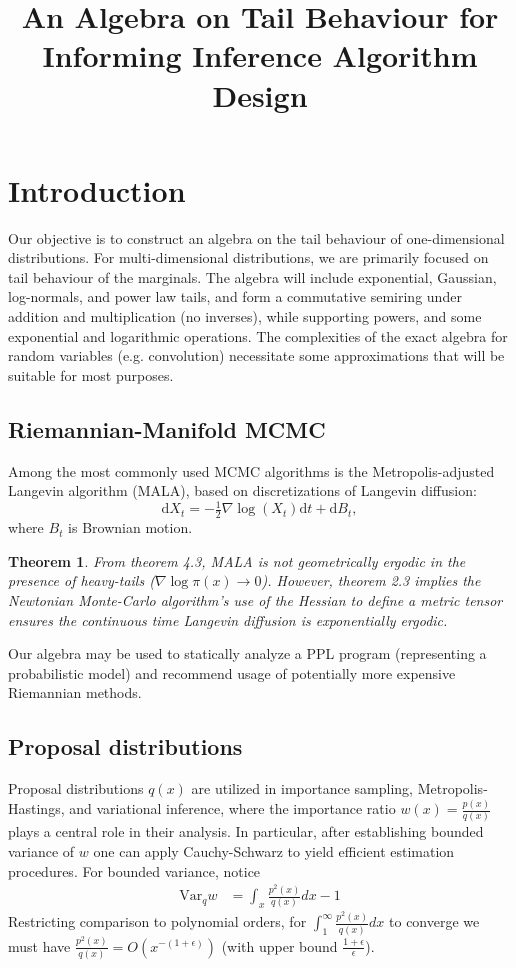 \documentclass{article}
\title{An Algebra on Tail Behaviour for Informing Inference Algorithm Design}
\newcommand{\dd}{\mathrm{d}}
\newtheorem{theorem}{Theorem}
\theoremstyle{definition}
\begin{document}
\maketitle

\section{Introduction}
Our objective is to construct an algebra on the tail behaviour of one-dimensional distributions. For multi-dimensional distributions, we are primarily focused on tail behaviour of the marginals. The algebra will include exponential, Gaussian, log-normals, and power law tails, and form a commutative semiring under addition and multiplication (no inverses), while supporting powers, and some exponential and logarithmic operations. The complexities of the exact algebra for random variables (e.g. convolution) necessitate some approximations that will be suitable for most purposes. 

\subsection{Riemannian-Manifold MCMC}
\label{ssec:mcmc}

Among the most commonly used MCMC algorithms is the Metropolis-adjusted Langevin algorithm (MALA), based on discretizations of Langevin diffusion:
\[
\dd X_t = -\tfrac12 \nabla \log(X_t) \dd t + \dd B_t,
\]
where $B_t$ is Brownian motion. 

\begin{theorem}\label{thm:nmc-ergodic}
    From \cite{roberts1996exponential} theorem 4.3, MALA is not geometrically ergodic
    in the presence of heavy-tails ($\nabla  \log \pi(x) \to 0$).
    However, theorem 2.3 implies the Newtonian Monte-Carlo algorithm's use of the Hessian to define a metric tensor ensures the continuous
    time Langevin diffusion is exponentially ergodic. 
\end{theorem}
Our algebra may be used
to statically analyze a PPL program (representing a probabilistic model) and
recommend usage of potentially more expensive Riemannian methods.

\subsection{Proposal distributions}

Proposal distributions $q(x)$ are utilized in importance sampling, Metropolis-Hastings,
and variational inference, where the importance ratio $w(x) = \frac{p(x)}{q(x)}$ plays a
central role in their analysis. In particular, after establishing bounded variance of $w$ one
can apply Cauchy-Schwarz to yield efficient estimation procedures. For bounded variance, notice
\begin{align*}
    \text{Var}_q w
    &= \int_x \frac{p^2(x)}{q(x)} dx - 1
\end{align*}
Restricting comparison to polynomial orders, for $\int_1^\infty \frac{p^2(x)}{q(x)} dx$
to converge we must have $\frac{p^2(x)}{q(x)} = O(x^{-(1+\epsilon)})$ (with
upper bound $\frac{1+\epsilon}{\epsilon}$).
\end{document}
